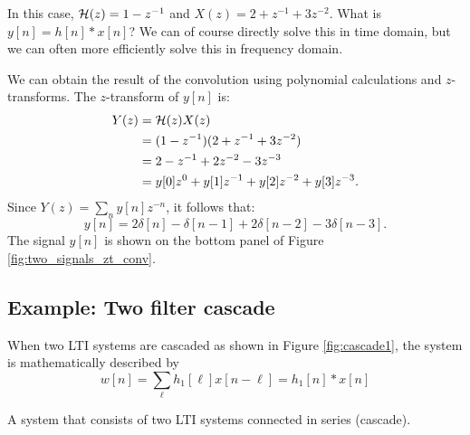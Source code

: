 In this case, $\mathcal{H}(z) = 1 - z^{-1}$ and $X(z)=2+z^{-1}+3z^{-2}$. What is
$y[n]=h[n]*x[n]$? We can of course directly solve this in time domain,
but we can often more efficiently solve this in frequency domain.

We can obtain the result of the convolution using polynomial calculations and $z$-transforms. The $z$-transform of $y[n]$ is:
\begin{align}
Y(z) & = \mathcal{H}(z) X(z) \\
     & = (1-z^{-1})(2+z^{-1}+3z^{-2})\\
     &= 2 - z^{-1} + 2z^{-2} - 3 z^{-3}\\
     &=y[0]z^0 +y[1] z^{-1} + y[2]z^{-2} +y[3]z^{-3}.
\end{align}
Since $Y(z)=\sum_n y[n] z^{-n}$, it follows that:
\begin{equation}
y[n]=2\delta[n]-\delta[n-1]+2\delta[n-2]-3\delta[n-3].
\end{equation}
The signal $y[n]$ is shown on the bottom panel of Figure \ref{fig:two_signals_zt_conv}.

\subsection{Example: Two filter cascade}

When two LTI systems are cascaded as shown in Figure
\ref{fig:cascade1}, the system is mathematically described by
\begin{equation}
w[n] = \sum_{\ell} h_1[\ell]x[n-\ell] = h_1[n]*x[n]
\end{equation}

\begin{marginfigure}
\begin{center}
\end{center}
\caption{A system that consists of two LTI systems connected in series (cascade).}
\label{fig:cascade1}
\end{marginfigure}

